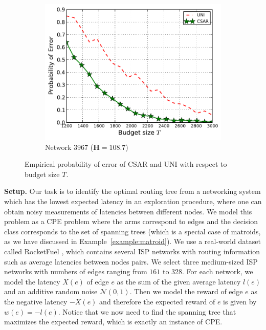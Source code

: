 \documentclass{article}
\newcommand{\AlgorithmBud}{{\small \textsf{CSAR}}\xspace}
\newcommand{\Uniform}{{\small \textsf{UNI}}\xspace}
\newcommand{\Problem}{{CPE}\xspace}
\begin{document}
\begin{figure}[ht]
\begin{subfigure}[c]{\imgsize\textwidth}
	\includegraphics[width=\textwidth]{fig/exp/mst-3967}
	\caption{Network 3967 ($\mathbf H=108.7$)}
\end{subfigure}
\caption{Empirical probability of error of \AlgorithmBud and \Uniform with respect to budget size $T$.}
\label{fig:exp3}
\end{figure}


\textbf{Setup.} 
Our task is to identify the optimal routing tree from a networking system which has the lowest expected latency  in an exploration procedure, where one can obtain noisy measurements of latencies between different nodes.
We model this problem as a \Problem problem where the arms correspond to edges and the decision class corresponds to the set of spanning trees (which is a special case of matroids, as we have discussed in Example~\ref{example:matroid}).
We use a real-world dataset called RocketFuel \citep{spring2002measuring}, which contains several ISP networks with routing information such as average latencies between nodes pairs. 
We select three medium-sized ISP networks with numbers of edges ranging from $161$ to 328.
For each network, we model the latency $X(e)$ of edge $e$ as the sum of the given average latency $l(e)$ and an additive random noise $\mathcal N(0, 1)$.
Then we model the reward of edge $e$ as the negative latency $-X(e)$ and therefore the expected reward of $e$ is given by $w(e) = -l(e)$.
Notice that we now need to find the spanning tree that maximizes the expected reward, which is exactly an instance of \Problem. 
\end{document}
